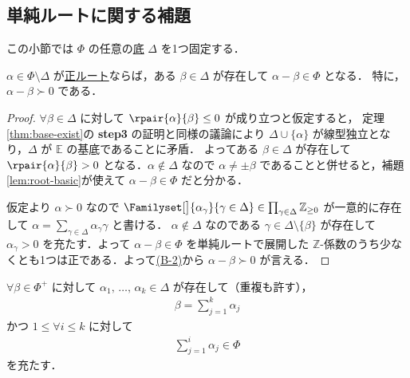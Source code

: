 \documentclass[rep_main]{subfiles}
\begin{document}
\subsection{単純ルートに関する補題}

この小節では $\Phi$ の任意の\hyperref[def:base-root]{底} $\Delta$ を1つ固定する．

\begin{mylem}[label=lem:simpleroot-A]{}
	$\alpha \in \Phi \setminus \Delta$ が\hyperref[def:base-root]{正ルート}ならば，ある $\beta \in \Delta$ が存在して $\alpha - \beta \in \Phi$ となる．
	特に，$\alpha - \beta \succ 0$ である．
\end{mylem}

\begin{proof}
	$\forall \beta \in \Delta$ に対して $\rpair{\alpha}{\beta} \le 0$ が成り立つと仮定すると，
	定理\ref{thm:base-exist}の \textsf{\textbf{step3}} の証明と同様の議論により
	$\Delta \cup \{\alpha\}$ が線型独立となり，$\Delta$ が $\mathbb{E}$ の基底であることに矛盾．
	よってある $\beta \in \Delta$ が存在して $\rpair{\alpha}{\beta} > 0$ となる．$\alpha \notin \Delta$ なので $\alpha \neq \pm \beta$ であることと併せると，補題\ref{lem:root-basic}が使えて $\alpha - \beta \in \Phi$ だと分かる．

	仮定より $\alpha \succ 0$ なので $\Familyset[\big]{\alpha_\gamma}{\gamma \in \Delta} \in \prod_{\gamma \in \Delta} \mathbb{Z}_{\ge 0}$ が一意的に存在して $\alpha = \sum_{\gamma \in \Delta} \alpha_\gamma \gamma$ と書ける．
	$\alpha \notin \Delta$ なのである $\gamma \in \Delta \setminus \{\beta\}$ が存在して $\alpha_\gamma > 0$ を充たす．よって $\alpha - \beta \in \Phi$ を単純ルートで展開した $\mathbb{Z}$-係数のうち少なくとも1つは正である．よって\hyperref[def:base-root]{(B-2)}から $\alpha - \beta \succ 0$ が言える．
\end{proof}


\begin{mycol}[label=col:simpleroot-A]{}
	$\forall \beta \in \Phi^+$ に対して $\alpha_1,\, \dots,\, \alpha_k \in \Delta$ が存在して（重複も許す），
	\begin{align}
		\beta = \sum_{j=1}^k \alpha_j
	\end{align}
	かつ $1 \le \forall i \le k$ に対して 
	\begin{align}
		\sum_{j=1}^i \alpha_j \in \Phi
	\end{align}
	を充たす．
\end{mycol}
\end{document}
